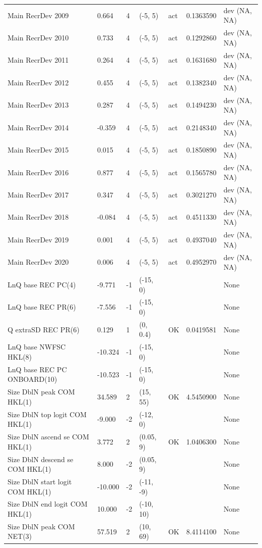 \documentclass[
  english,
  a4paper,
]{article}
\begin{document}
\begin{landscape}
\begin{longtable}[t]{>{\raggedright\arraybackslash}p{8.5cm}lllll>{\raggedright\arraybackslash}p{4cm}}
Main RecrDev 2009 & 0.664 & 4 & (-5, 5) & act & 0.1363590 & dev (NA, NA)\\
Main RecrDev 2010 & 0.733 & 4 & (-5, 5) & act & 0.1292860 & dev (NA, NA)\\
Main RecrDev 2011 & 0.264 & 4 & (-5, 5) & act & 0.1631680 & dev (NA, NA)\\
Main RecrDev 2012 & 0.455 & 4 & (-5, 5) & act & 0.1382340 & dev (NA, NA)\\
Main RecrDev 2013 & 0.287 & 4 & (-5, 5) & act & 0.1494230 & dev (NA, NA)\\
Main RecrDev 2014 & -0.359 & 4 & (-5, 5) & act & 0.2148340 & dev (NA, NA)\\
Main RecrDev 2015 & 0.015 & 4 & (-5, 5) & act & 0.1850890 & dev (NA, NA)\\
Main RecrDev 2016 & 0.877 & 4 & (-5, 5) & act & 0.1565780 & dev (NA, NA)\\
Main RecrDev 2017 & 0.347 & 4 & (-5, 5) & act & 0.3021270 & dev (NA, NA)\\
Main RecrDev 2018 & -0.084 & 4 & (-5, 5) & act & 0.4511330 & dev (NA, NA)\\
Main RecrDev 2019 & 0.001 & 4 & (-5, 5) & act & 0.4937040 & dev (NA, NA)\\
Main RecrDev 2020 & 0.006 & 4 & (-5, 5) & act & 0.4952970 & dev (NA, NA)\\
LnQ base REC PC(4) & -9.771 & -1 & (-15, 0) &  &  & None\\
LnQ base REC PR(6) & -7.556 & -1 & (-15, 0) &  &  & None\\
Q extraSD REC PR(6) & 0.129 & 1 & (0, 0.4) & OK & 0.0419581 & None\\
LnQ base NWFSC HKL(8) & -10.324 & -1 & (-15, 0) &  &  & None\\
LnQ base REC PC ONBOARD(10) & -10.523 & -1 & (-15, 0) &  &  & None\\
Size DblN peak COM HKL(1) & 34.589 & 2 & (15, 55) & OK & 4.5450900 & None\\
Size DblN top logit COM HKL(1) & -9.000 & -2 & (-12, 0) &  &  & None\\
Size DblN ascend se COM HKL(1) & 3.772 & 2 & (0.05, 9) & OK & 1.0406300 & None\\
Size DblN descend se COM HKL(1) & 8.000 & -2 & (0.05, 9) &  &  & None\\
Size DblN start logit COM HKL(1) & -10.000 & -2 & (-11, -9) &  &  & None\\
Size DblN end logit COM HKL(1) & 10.000 & -2 & (-10, 10) &  &  & None\\
Size DblN peak COM NET(3) & 57.519 & 2 & (10, 69) & OK & 8.4114100 & None\\

\end{longtable}
\end{landscape}
\end{document}
